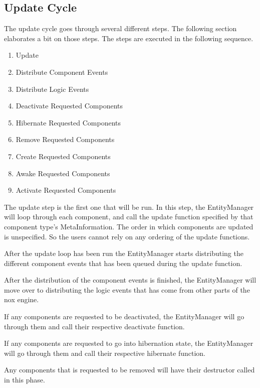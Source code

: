 \subsection{Update Cycle}
The update cycle goes through several different steps. The following section elaborates a bit on those steps. The steps are executed in the following sequence.
\begin{enumerate}
    \item Update
    \item Distribute Component Events
    \item Distribute Logic Events
    \item Deactivate Requested Components
    \item Hibernate Requested Components
    \item Remove Requested Components
    \item Create Requested Components
    \item Awake Requested Components
    \item Activate Requested Components
\end{enumerate}

The update step is the first one that will be run. In this step, the EntityManager will loop through each component, 
and call the update function specified by that component type's MetaInformation.
The order in which components are updated is unspecified. So the users cannot rely on any ordering of the update functions.

After the update loop has been run the EntityManager starts distributing the different component events that has been queued during the update function.

After the distribution of the component events is finished, 
the EntityManager will move over to distributing the logic events that has come from other parts of the nox engine.

If any components are requested to be deactivated, the EntityManager will go through them and call their respective deactivate function.

If any components are requested to go into hibernation state, the EntityManager will go through them and call their respective hibernate function.

Any components that is requested to be removed will have their destructor called in this phase.

